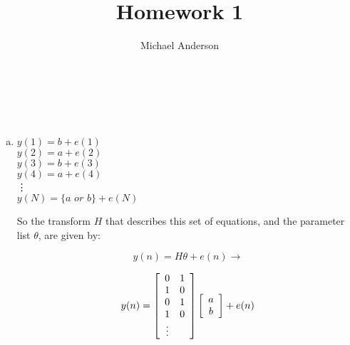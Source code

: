 \documentclass{article}
\author{Michael Anderson}
\title{Homework 1}
\begin{document}
\setlength{\parskip}{1em}
\maketitle
{}
\\
\flushleft
\newpage
\thispagestyle{empty}
\mbox{}
\pagebreak

\section{}
\begin{enumerate}[(a)]
\item
$y(1) = b + e(1)$\\
$y(2) = a + e(2)$\\
$y(3) = b + e(3)$\\
$y(4) = a + e(4)$\\
\hspace{1pt} \vdots \\
$y(N) = \{a \hspace{4pt} or \hspace{4pt} b\} + e(N)$
\vspace{1em}

So the transform $H$ that describes this set of equations, and the parameter
list $\theta$, are given by:

\[
y(n) = H\theta + e(n) \rightarrow
\]

\[
y(n) =
\left[ \begin{array}{c c}
0 & 1 \\
1 & 0 \\
0 & 1 \\
1 & 0 \\
\vdots \\
\end{array}
\right]
\left[ \begin{array}{c}
a \\
b \\
\end{array} \right]
+ e(n)
\]


\end{enumerate}
\end{document}

